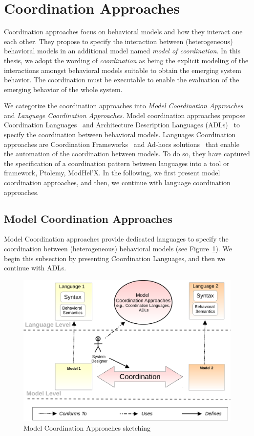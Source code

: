 \section{Coordination Approaches}
Coordination approaches focus on behavioral models and how they interact one each other. They propose to specify the interaction between (heterogeneous) behavioral models in an additional model named \emph{model of coordination}. In this thesis, we adopt the wording of \emph{coordination} as being the explicit modeling of the interactions amongst behavioral models suitable to obtain the emerging system behavior. The coordination must be executable to enable the evaluation of the emerging behavior of the whole system. 

We categorize the coordination approaches into \emph{Model Coordination Approaches} and \emph{Language Coordination Approaches}. Model coordination approaches propose Coordination Languages~\cite{coordsignibib} and Architecture Description Languages (ADLs)~\cite{frameadlsbib} to specify the coordination between behavioral models. Languages Coordination approaches are Coordination Frameworks~\cite{ptoleframebib,modhelxbib} and Ad-hocs solutions~\cite{mascotbib,dinatale} that enable the automation of the coordination between models. To do so, they have captured the specification of a coordination pattern between languages into a tool or framework, \eg Ptolemy, ModHel'X. In the following, we first present model coordination approaches, and then, we continue with language coordination approaches.
\subsection{Model Coordination Approaches}
Model Coordination approaches provide dedicated languages to specify the coordination between (heterogeneous) behavioral models (see Figure~\ref{fig:modelcoord}). We begin this subsection by presenting Coordination Languages, and then we continue with ADLs. 

\begin{figure}
	\begin{center}
		\includegraphics[width=.7\textwidth]{background/figs/coordmodel}
		\caption{Model Coordination Approaches sketching}
		\label{fig:modelcoord}
	\end{center}
\end{figure}

